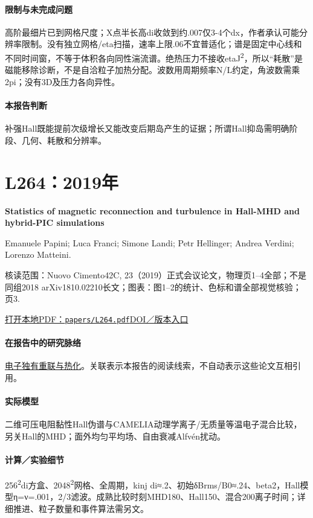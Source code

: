 \documentclass[UTF8,a4paper,11pt,openany,fontset=fandol]{ctexbook}
\begin{document}
\paragraph{限制与未完成问题}高阶最细片已到网格尺度；X点半长高di收敛到约.007仅3-4个dx，作者承认可能分辨率限制。没有独立网格/eta扫描，速率上限.06不宜普适化；谱是固定中心线和不同时间窗，不等于体积各向同性湍流谱。绝热压力不接收etaJ\textsuperscript{2}，所以“耗散”是磁能移除诊断，不是自洽粒子加热分配。波数用周期频率N/L约定，角波数需乘2pi；没有3D及压力各向异性。

\paragraph{本报告判断}补强Hall既能提前次级增长又能改变后期岛产生的证据；所谓Hall抑岛需明确阶段、几何、耗散和分辨率。

\section{L264：2019年}\label{paper:L264}

\textbf{Statistics of magnetic reconnection and turbulence in Hall-MHD and hybrid-PIC simulations}\citep{L264}\

Emanuele Papini;  Luca Franci;  Simone Landi;  Petr Hellinger;  Andrea Verdini;  Lorenzo Matteini.

\textsf{核读范围：}Nuovo Cimento42C, 23（2019）正式会议论文，物理页1–4全部；不是同组2018 arXiv1810.02210长文；\textsf{图表：}图1–2的统计、色标和谱全部视觉核验；页3.

\href{run:../papers/L264.pdf}{打开本地PDF：\texttt{papers/L264.pdf}}\quad\href{https://doi.org/10.1393/ncc/i2019-19023-0}{DOI／版本入口}

\paragraph{在报告中的研究脉络}\hyperref[story:energy]{电子独有重联与热化}。关联表示本报告的阅读线索，不自动表示这些论文互相引用。

\paragraph{实际模型}二维可压电阻黏性Hall伪谱与CAMELIA动理学离子/无质量等温电子混合比较，另关Hall的MHD；面外均匀平均场、自由衰减Alfvén扰动。

\paragraph{计算／实验细节}256\textsuperscript{2}di方盒、2048\textsuperscript{2}网格、全周期，kinj di≈.2、初始δBrms/B0≈.24、beta2，Hall模型η=ν=.001，2/3滤波。成熟比较时刻MHD180、Hall150、混合200离子时间；详细推进、粒子数量和事件算法需另文。
\end{document}
